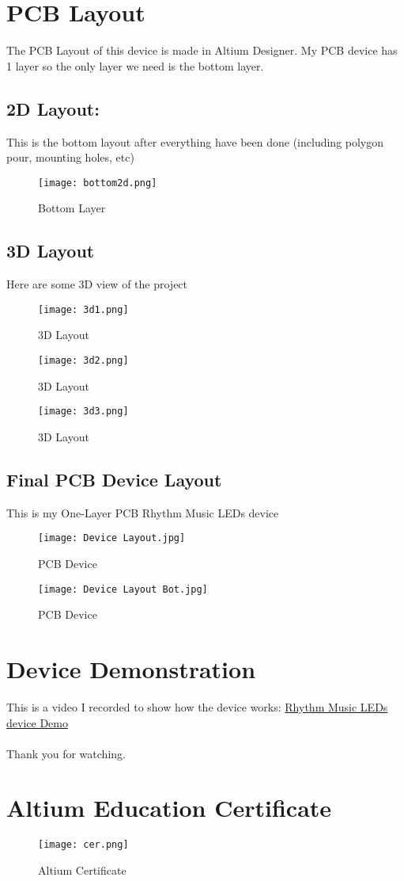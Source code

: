 \documentclass[a4paper]{article}
\numberwithin{figure}{section}
\begin{document}
\section{PCB Layout}
The PCB Layout of this device is made in Altium Designer. My PCB device has 1 layer so the only layer we need is the bottom layer.
\subsection{2D Layout:}
This is the bottom layout after everything have been done (including polygon pour, mounting holes, etc)
\begin{figure}[H]
    \centering
    \texttt{[image: bottom2d.png]}
    \caption{Bottom Layer}
\end{figure}
\newpage
\subsection{3D Layout}
Here are some 3D view of the project
\begin{figure}[H]
    \centering
    \texttt{[image: 3d1.png]}
    \caption{3D Layout}
\end{figure}
\begin{figure}[H]
    \centering
    \texttt{[image: 3d2.png]}
    \caption{3D Layout}
\end{figure}
\begin{figure}[H]
    \centering
    \texttt{[image: 3d3.png]}
    \caption{3D Layout}
\end{figure}
\subsection{Final PCB Device Layout}
This is my One-Layer PCB Rhythm Music LEDs device
\begin{figure}[H]
    \centering
    \texttt{[image: Device Layout.jpg]}
    \caption{PCB Device}
\end{figure}
\begin{figure}[H]
    \centering
    \texttt{[image: Device Layout Bot.jpg]}
    \caption{PCB Device}
\end{figure}
\section{Device Demonstration}
This is a video I recorded to show how the device works: \href{https://www.youtube.com/watch?v=cwNKPTRDnqY}{Rhythm Music LEDs device Demo}
\\ \\
Thank you for watching.
\section{Altium Education Certificate}
\begin{figure}[H]
    \centering
    \texttt{[image: cer.png]}
    \caption{Altium Certificate}
\end{figure}
\end{document}
